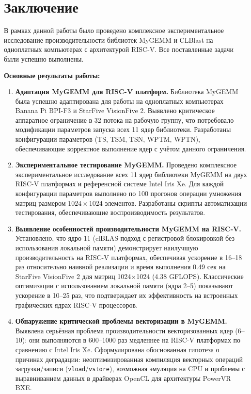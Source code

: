 
\section*{Заключение}

В рамках данной работы было проведено комплексное экспериментальное исследование производительности библиотек MyGEMM и CLBlast на одноплатных компьютерах с архитектурой RISC-V. Все поставленные задачи были успешно выполнены.

\textbf{Основные результаты работы:}

\begin{enumerate}
    \item \textbf{Адаптация MyGEMM для RISC-V платформ.} Библиотека MyGEMM была успешно адаптирована для работы на одноплатных компьютерах Banana Pi BPI-F3 и StarFive VisionFive 2. Выявлено критическое аппаратное ограничение в 32 потока на рабочую группу, что потребовало модификации параметров запуска всех 11 ядер библиотеки. Разработаны конфигурации параметров (TS, TSM, TSN, WPTM, WPTN), обеспечивающие корректное выполнение ядер с учётом данного ограничения.
    
    \item \textbf{Экспериментальное тестирование MyGEMM.} Проведено комплексное экспериментальное исследование всех 11 ядер библиотеки MyGEMM на двух RISC-V платформах и референсной системе Intel Iris Xe. Для каждой конфигурации параметров выполнено по 100 прогонов операции умножения матриц размером $1024 \times 1024$ элементов. Разработаны скрипты автоматизации тестирования, обеспечивающие воспроизводимость результатов.
    
    \item \textbf{Выявление особенностей производительности MyGEMM на RISC-V.} Установлено, что ядро 11 (clBLAS-подход с регистровой блокировкой без использования локальной памяти) демонстрирует наилучшую производительность на RISC-V платформах, обеспечивая ускорение в 16--18 раз относительно наивной реализации и время выполнения 0.49 сек на StarFive VisionFive 2 для матриц 1024×1024 (4.38 GFLOPS). Классические оптимизации с использованием локальной памяти (ядра 2--5) показывают ускорение в 10--25 раз, что подтверждает их эффективность на встроенных графических ядрах RISC-V процессоров.
    
    \item \textbf{Обнаружение критической проблемы векторизации в MyGEMM.} Выявлена серьёзная проблема производительности векторизованных ядер (6--10): они выполняются в 600--1000 раз медленнее на RISC-V платформах по сравнению с Intel Iris Xe. Сформулирована обоснованная гипотеза о причинах деградации: неоптимизированная компиляция векторных операций загрузки/записи (\texttt{vload}/\texttt{vstore}), возможная эмуляция на CPU и проблемы с выравниванием данных в драйверах OpenCL для архитектуры PowerVR BXE.
    

\end{enumerate}
